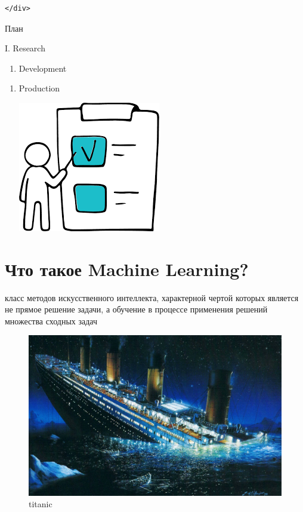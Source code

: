 \documentclass[11pt]{article}
\makeatletter
\def\maxwidth{\ifdim\Gin@nat@width>\linewidth\linewidth
    \else\Gin@nat@width\fi}
\let\Oldincludegraphics\includegraphics
\renewcommand{\includegraphics}[1]{\Oldincludegraphics[width=.8\maxwidth]{#1}}
\providecommand{\tightlist}{%
      \setlength{\itemsep}{0pt}\setlength{\parskip}{0pt}}
\makeatother
\begin{document}
\begin{verbatim}
</div>
\end{verbatim}

    План

I. Research

\begin{enumerate}
\def\labelenumi{\Roman{enumi}.}
\setcounter{enumi}{1}
\tightlist
\item
  Development
\end{enumerate}

\begin{enumerate}
\def\labelenumi{\Roman{enumi}.}
\setcounter{enumi}{2}
\tightlist
\item
  Production

  \includegraphics{images/plan.png}
\end{enumerate}

    \hypertarget{ux447ux442ux43e-ux442ux430ux43aux43eux435-machine-learning}{%
\section{Что такое Machine
Learning?}\label{ux447ux442ux43e-ux442ux430ux43aux43eux435-machine-learning}}

класс методов искусственного интеллекта, характерной чертой которых
является не прямое решение задачи, а обучение в процессе применения
решений множества сходных задач

    \begin{figure}
\centering
\includegraphics{images/titanic.jpg}
\caption{titanic}
\end{figure}
\end{document}
